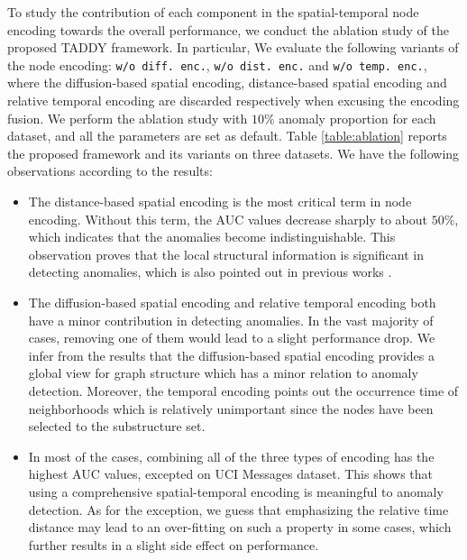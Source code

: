 \documentclass[10pt,journal,compsoc]{IEEEtran}
\newcommand{\HL}{}
\begin{document}
To study the contribution of each component in the spatial-temporal node encoding towards the overall performance, we conduct the ablation study of the proposed TADDY framework. In particular, We evaluate the following variants of the node encoding: \texttt{w/o diff. enc.}, \texttt{w/o dist. enc.} and \texttt{w/o temp. enc.}, where the diffusion-based spatial encoding, distance-based spatial encoding and relative temporal encoding are discarded respectively when excusing the encoding fusion. We perform the ablation study with $10\%$ anomaly proportion for each dataset, and all the parameters are set as default. Table \ref{table:ablation} reports the proposed framework and its variants on three datasets. We have the following observations according to the results:

\begin{itemize} 

	\item The distance-based spatial encoding is the most critical term in node encoding. Without this term, the AUC \HL{values} decrease sharply to about $50\%$, which indicates that the anomalies become indistinguishable. This observation proves that the local structural information is significant in detecting anomalies, which is also pointed out in previous works \cite{cai2020structural,liu2021anomaly}. 
	
	\item The diffusion-based spatial encoding and relative temporal encoding both have a minor contribution in detecting anomalies. In the vast majority of cases, removing one of them would lead to a slight performance drop. We infer from the results that the diffusion-based spatial encoding provides a global view for graph structure which has a minor relation to anomaly detection. Moreover, the temporal encoding points out the occurrence time of neighborhoods which is relatively unimportant since the nodes have been selected to the substructure set.
	
	\item In most of the cases, combining all of the three types of encoding has the highest AUC \HL{values}, excepted on UCI Messages dataset. This shows that using a comprehensive spatial-temporal encoding is meaningful to anomaly detection. As for the exception, we guess that emphasizing the relative time distance may lead to an over-fitting on such \HL{a} property in some cases, which further results in a slight side effect on performance.
	
\end{itemize}
\end{document}
